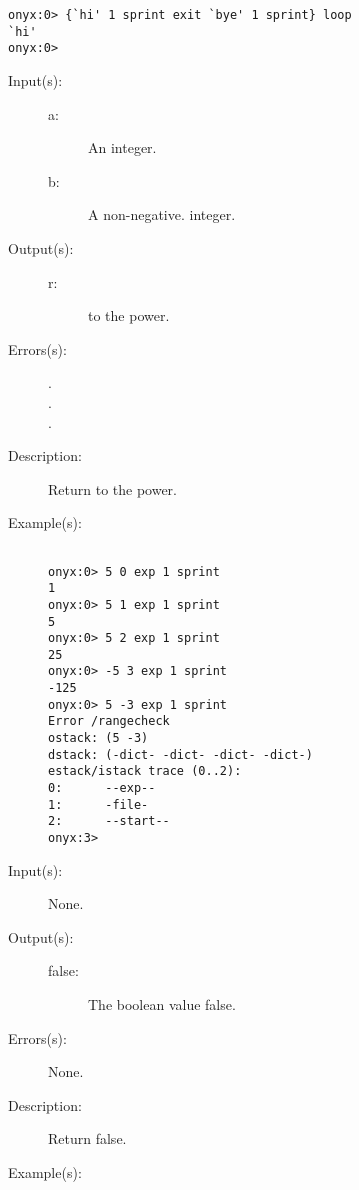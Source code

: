 \begin{description}
\begin{description}
\begin{verbatim}
onyx:0> {`hi' 1 sprint exit `bye' 1 sprint} loop
`hi'
onyx:0>
		\end{verbatim}
	\end{description}
\label{systemdict:exp}
\item[{\onyxop{a b}{exp}{r}}: ]
	\begin{description}\item[]
	\item[Input(s): ]
		\begin{description}\item[]
		\item[a: ]
			An integer.
		\item[b: ]
			A non-negative. integer.
		\end{description}
	\item[Output(s): ]
		\begin{description}\item[]
		\item[r: ]
			 to the  power.
		\end{description}
	\item[Errors(s): ]
		\begin{description}\item[]
		\item[.]
		\item[.]
		\item[.]
		\end{description}
	\item[Description: ]
		Return  to the  power.
	\item[Example(s): ]\begin{verbatim}

onyx:0> 5 0 exp 1 sprint
1
onyx:0> 5 1 exp 1 sprint
5
onyx:0> 5 2 exp 1 sprint
25
onyx:0> -5 3 exp 1 sprint
-125
onyx:0> 5 -3 exp 1 sprint
Error /rangecheck
ostack: (5 -3)
dstack: (-dict- -dict- -dict- -dict-)
estack/istack trace (0..2):
0:      --exp--
1:      -file-
2:      --start--
onyx:3>
		\end{verbatim}
	\end{description}
\label{systemdict:false}
\item[{\onyxop{--}{false}{false}}: ]
	\begin{description}\item[]
	\item[Input(s): ] None.
	\item[Output(s): ]
		\begin{description}\item[]
		\item[false: ]
			The boolean value false.
		\end{description}
	\item[Errors(s): ] None.
	\item[Description: ]
		Return false.
	\item[Example(s): ]\begin{verbatim}


\end{verbatim}
\end{description}
\end{description}

